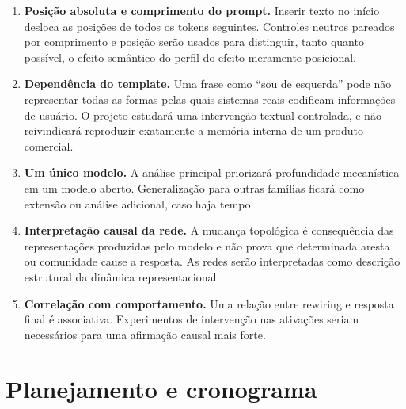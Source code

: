 \documentclass[11pt,a4paper]{article}
\begin{document}
\begin{enumerate}
    \item \textbf{Posição absoluta e comprimento do prompt.} Inserir texto no início desloca as posições de todos os tokens seguintes. Controles neutros pareados por comprimento e posição serão usados para distinguir, tanto quanto possível, o efeito semântico do perfil do efeito meramente posicional.

    \item \textbf{Dependência do template.} Uma frase como ``sou de esquerda'' pode não representar todas as formas pelas quais sistemas reais codificam informações de usuário. O projeto estudará uma intervenção textual controlada, e não reivindicará reproduzir exatamente a memória interna de um produto comercial.

    \item \textbf{Um único modelo.} A análise principal priorizará profundidade mecanística em um modelo aberto. Generalização para outras famílias ficará como extensão ou análise adicional, caso haja tempo.

    \item \textbf{Interpretação causal da rede.} A mudança topológica é consequência das representações produzidas pelo modelo e não prova que determinada aresta ou comunidade cause a resposta. As redes serão interpretadas como descrição estrutural da dinâmica representacional.

    \item \textbf{Correlação com comportamento.} Uma relação entre rewiring e resposta final é associativa. Experimentos de intervenção nas ativações seriam necessários para uma afirmação causal mais forte.
\end{enumerate}

\section{Planejamento e cronograma}
\end{document}
